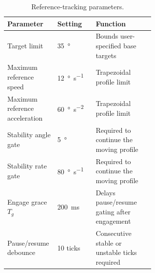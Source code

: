\begin{table}[htbp]
  \centering
  \footnotesize
  \renewcommand{\arraystretch}{1.05}
  \caption{Reference-tracking parameters.}
  \begin{tabularx}{\linewidth}{@{}p{0.34\linewidth}p{0.26\linewidth}X@{}}
    \toprule
    Parameter & Setting & Function \\
    \midrule
    Target limit & \SI{35}{\degree} & Bounds user-specified base targets \\
    Maximum reference speed & \SI{12}{\degree\per\second} & Trapezoidal profile limit \\
    Maximum reference acceleration & \SI{60}{\degree\per\second\squared} & Trapezoidal profile limit \\
    Stability angle gate & \SI{5}{\degree} & Required to continue the moving profile \\
    Stability rate gate & \SI{80}{\degree\per\second} & Required to continue the moving profile \\
    Engage grace $T_g$ & \SI{200}{ms} & Delays pause/resume gating after engagement \\
    Pause/resume debounce & 10 ticks & Consecutive stable or unstable ticks required \\
    \bottomrule
  \end{tabularx}
\end{table}

